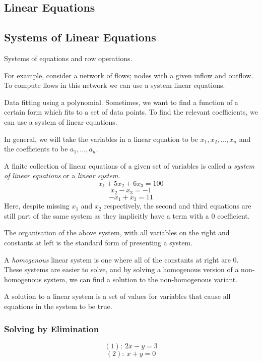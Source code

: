 \documentclass[12pt]{report}
\begin{document}
\begin{flushleft}

\section*{Linear Equations}

\subsection*{Systems of Linear Equations}
Systems of equations and row operations.

For example, consider a network of flows; nodes with a given
inflow and outflow. To compute flows in this network we can use a
system linear equations.

Data fitting using a polynomial. Sometimes, we want to find a
function of a certain form which fits to a set of data points. To
find the relevant coefficients, we can use a system of linear
equations.

In general, we will take the variables in a linear equation to
be \(x_1, x_2, \ldots, x_n\) and the coefficients to be
\(a_1, \ldots, a_n\).

A finite collection of linear equations of a given set of variables
is called a \textit{system of linear equations} or a \textit{linear system}.
\[x_1 + 5x_2 + 6x_3 = 100\]
\[x_2 - x_3 = -1\]
\[-x_1 + x_3 = 11\]
Here, despite missing \(x_1\) and \(x_2\) respectively, the second and third
equations are still part of the same system as they implicitly have a term
with a \(0\) coefficient. \par
The organisation of the above system, with all variables on the right and
constants at left is the standard form of presenting a system.

A \textit{homogenous} linear system is one where all of the constants at right
are \(0\). These systems are easier to solve, and by solving a homogenous
version of a non-homogenous system, we can find a solution to the non-homogenous
variant.

A solution to a linear system is a set of values for variables that cause all
equations in the system to be true.

\subsubsection*{Solving by Elimination}

\[(1):\: 2x - y = 3\]
\[(2):\: x + y = 0\]


\end{flushleft}
\end{document}
